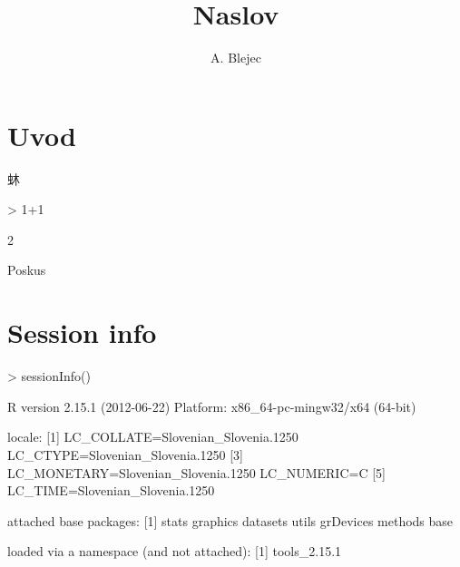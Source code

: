 \documentclass[10pt]{article}
\title{Naslov}
\author{A. Blejec}
\begin{document}

\maketitle
\tableofcontents
\clearpage
\section{Uvod}
蚞
\begin{Schunk}
\begin{Sinput}
> 1+1
\end{Sinput}
\begin{Soutput}
[1] 2
\end{Soutput}
\end{Schunk}
Poskus
\clearpage
\section{Session info}
\begin{Schunk}
\begin{Sinput}
> sessionInfo()
\end{Sinput}
\begin{Soutput}
R version 2.15.1 (2012-06-22)
Platform: x86_64-pc-mingw32/x64 (64-bit)

locale:
[1] LC_COLLATE=Slovenian_Slovenia.1250  LC_CTYPE=Slovenian_Slovenia.1250   
[3] LC_MONETARY=Slovenian_Slovenia.1250 LC_NUMERIC=C                       
[5] LC_TIME=Slovenian_Slovenia.1250    

attached base packages:
[1] stats     graphics  datasets  utils     grDevices methods   base     

loaded via a namespace (and not attached):
[1] tools_2.15.1
\end{Soutput}
\end{Schunk}
\end{document}
